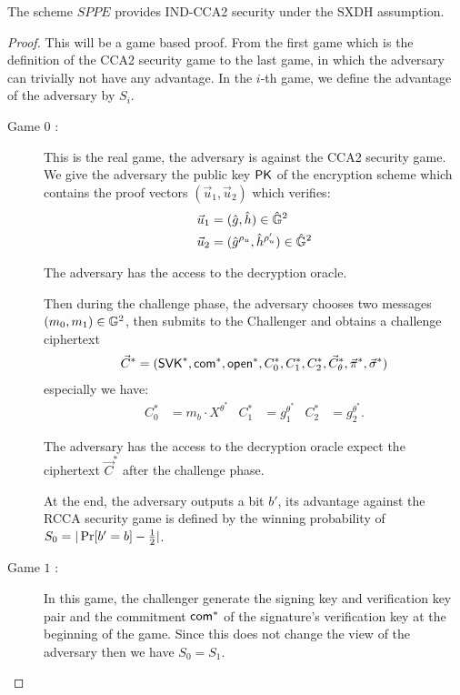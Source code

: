 \begin{myTh}
  The scheme $SPPE$ provides IND-CCA2 security under the SXDH assumption.
\end{myTh}


\begin{proof}

  This will be a game based proof. From the first game which is the definition of the CCA2 security game to the last game, in which the adversary can trivially not have any advantage. In the $i$-th game, we define the advantage of the adversary by $S_i$.

  \begin{description}
  \item[\textsf{Game} $0$ :] This is the real game, the adversary is against the CCA2 security game. We give the adversary the public key $\mathsf{PK}$ of the encryption scheme which contains the proof vectors $(\vec{u}_1, \vec{u}_2)$ which verifies:
    \begin{align*}
      \vec{u}_1 &= (\hat{g}, \hat{h}) \in \hat{\mathbb{G}}^2\\
      \vec{u}_2 &= (\hat{g}^{\rho_u}, \hat{h}^{\rho_u'}) \in \hat{\mathbb{G}}^2
    \end{align*}

    The adversary has the access to the decryption oracle.
    
    Then during the challenge phase, the adversary chooses two messages $(m_0, m_1) \in \mathbb{G}^2$, then submits to the Challenger and obtains a challenge ciphertext
    \begin{align*}
      \vec{C}^* = (\mathsf{SVK}^*, \mathsf{com}^*, \mathsf{open}^*, C_0^*, C_1^*, C_2^*, \vec{C}_{\theta}^*, \vec{\pi}^*, \vec{\sigma}^*)
    \end{align*}
    especially we have:
    \begin{align*}
      C_0^* &= m_b \cdot X^{\theta^*} & C_1^* &= g_1^{\theta^*} & C_2^* &= g_2^{\theta^*}.
    \end{align*}

    The adversary has the access to the decryption oracle expect the ciphertext $\vec{C}^*$ after the challenge phase.

    At the end, the adversary outputs a bit $b'$, its advantage against the RCCA security game is defined by the winning probability of $S_0 = |\operatorname{Pr}[b' = b] - \frac{1}{2}|$.

  \item[\textsf{Game} $1$ :] In this game, the challenger generate the signing key and verification key pair and the commitment $\mathsf{com}^*$ of the signature's verification key at the beginning of the game. Since this does not change the view of the adversary then we have $S_0 = S_1$.


\end{description}
\end{proof}
